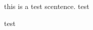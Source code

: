 \begin{Introduction} %
\begin{Introduction}%
\begin{Introduction}    %
this is a test scentence. test
\end{Introduction}
\begin{Introduction}
test
\end{Introduction}
\end{Introduction}
\end{Introduction}